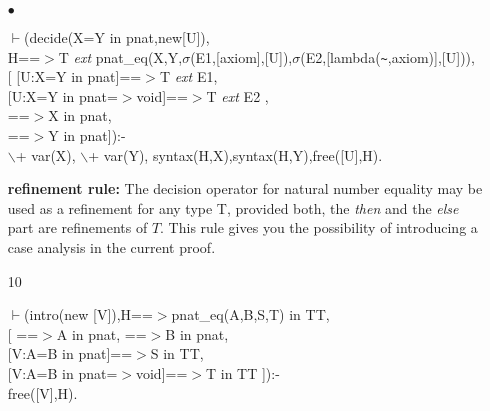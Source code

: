 \documentclass[11pt]{report}
\begin{document}
\begin{enumerate}
\begin{description}
 \end{description}
 \item[$\bullet$]
\begin{sf}\begin{tabbing}
$\vdash$(decide(X=Y in pnat,new[U]),\\[-0.15ex]
\hspace{2em}H==$>$T \mbox{\it ext} pnat\_\hspace{0.1em}eq(X,Y,$\sigma$(E1,[axiom],[U]),$\sigma$(E2,[lambda({\verb`~`},axiom)],[U])),\\[-0.15ex]
\hspace{2em}[ [U:X=Y in pnat]==$>$T \mbox{\it ext} E1, \\[-0.15ex]
\hspace{2em}[U:X=Y in pnat=$>$void]==$>$T \mbox{\it ext} E2 ,\\[-0.15ex]
\hspace{4em}==$>$X in pnat,\\[-0.15ex]
\hspace{4em}==$>$Y in pnat]):-\\[-0.15ex]
\hspace{2em}$\backslash$+ var(X), $\backslash$+ var(Y), syntax(H,X),syntax(H,Y),free([U],H).
\end{tabbing}\end{sf}

 {\bf refinement rule:}
 The decision operator for natural number equality may be used as
 a refinement for any type T, provided both, the \emph{then} and 
 the \emph{else} part are refinements of $T$. This rule gives
 you the possibility of introducing a case analysis in the
 current proof.   
 
 \item[10]
\begin{sf}\begin{tabbing}
$\vdash$(intro(new [V]),H==$>$pnat\_\hspace{0.1em}eq(A,B,S,T) in TT,\\[-0.15ex]
\hspace{2em}[ ==$>$A in pnat, ==$>$B in pnat,\\[-0.15ex]
\hspace{3em}[V:A=B in pnat]==$>$S in TT, \\[-0.15ex]
\hspace{3em}[V:A=B in pnat=$>$void]==$>$T in TT ]):-\\[-0.15ex]
\hspace{2em}free([V],H).
\end{tabbing}\end{sf}


\end{enumerate}
\end{document}
